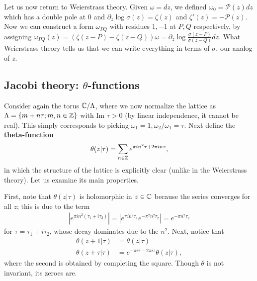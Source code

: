 \documentclass{../mathnotes}
\begin{document}
Let us now return to Weierstrass theory. Given $\omega=dz$, we defined $\omega_0=\mathcal{P}(z)dz$ which has a double pole at 0 and
$\partial_z\log\sigma(z)=\zeta(z)$ and $\zeta'(z)=-\mathcal{P}(z)$. Now we can construct a form $\omega_{PQ}$ with residues $1,-1$ at $P,Q$ respectively,
by assigning $\omega_{PQ}(z)=\left( \zeta(z-P)-\zeta(z-Q) \right)\omega=\partial_z\log\frac{\sigma(z-P)}{\sigma(z-Q)}dz$. What Weierstrass theory
tells us that we can write everything in terms of $\sigma$, our analog of $z$.

\subsection*{Jacobi theory: $\theta$-functions}

Consider again the torus $\mathbb{C}/\Lambda$, where we now normalize the lattice as $\Lambda=\left\{ m+n\tau; m,n\in\mathbb{Z}\right\}$ with $\text{Im }\tau>0$ (by linear independence,
it cannot be real). This simply corresponds to picking $\omega_1=1,\omega_2/\omega_1=\tau$. Next define the \textbf{theta-function}
\begin{align*}
    \theta(z|\tau)=\sum_{n\in \mathbb{Z}}e^{\pi in^2\tau+2\pi inz},
\end{align*}
in which the structure of the lattice is explicitly clear (unlike in the Weierstrass theory). Let us examine its main properties.

First, note that $\theta(z|\tau)$ is holomorphic in $z\in\mathbb{C}$ because the series converges for all $z$; this is due to the term
\begin{align*}
    |e^{\pi in^2(\tau_1+i\tau_2)}|=|e^{\pi in^2\tau_1}e^{-\pi^2n^2\tau_2}|=e^{-\pi n^2\tau_2}
\end{align*}
for $\tau=\tau_1+i\tau_2$, whose decay dominates due to the $n^2$. Next, notice that
\begin{align*}
    \theta(z+1|\tau)&=\theta(z|\tau)\\
    \theta(z+\tau|\tau)&=e^{-\pi i\tau-2\pi iz}\theta(z|\tau),
\end{align*}
where the second is obtained by completing the square. Though $\theta$ is not invariant, its zeroes are.
\end{document}

